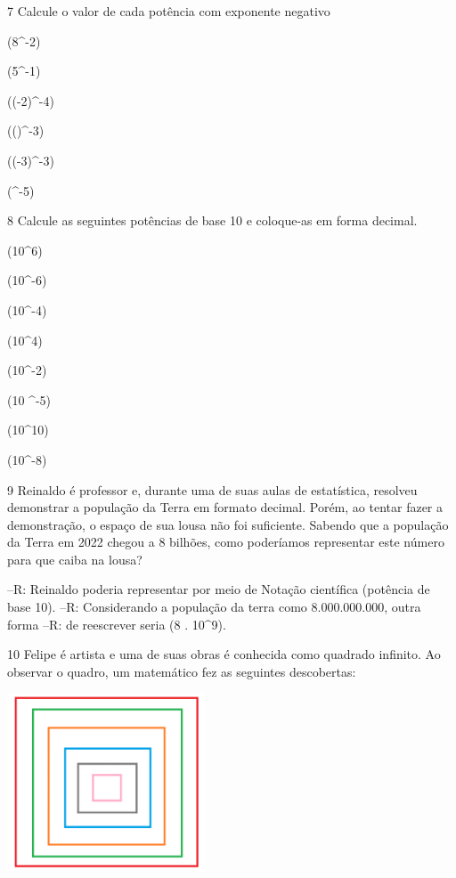 \num{7} Calcule o valor de cada potência com exponente negativo
\item (8^{-2}) 
\item (5^{-1}) 
\item ((-2)^{-4}) 
\item (()^{-3}) 
\item ((-3)^{-3}) 
\item (^{-5}) 


\num{8} Calcule as seguintes potências de base 10 e coloque-as em forma
decimal.

\item (10^6)
\item (10^-6)
\item (10^-4)
\item (10^4)
\item (10^-2)
\item (10 ^-5)
\item (10^10)
\item (10^-8)




\num{9} Reinaldo é professor e, durante uma de suas aulas de estatística,
resolveu demonstrar a população da Terra em formato decimal. Porém, ao
tentar fazer a demonstração, o espaço de sua lousa não foi suficiente.
Sabendo que a população da Terra em 2022 chegou a 8 bilhões, como
poderíamos representar este número para que caiba na lousa?

--R: Reinaldo poderia representar por meio de Notação científica (potência de base 10).
--R: Considerando a população da terra como 8.000.000.000, outra forma 
--R: de reescrever seria (8 . 10^9).

\num{10} Felipe é artista e uma de suas obras é conhecida como quadrado
infinito. Ao observar o quadro, um matemático fez as seguintes
descobertas:

\includegraphics[width=2.3125in,height=2.07917in]{./imgSAEB_8_MAT/media/image2.png}

